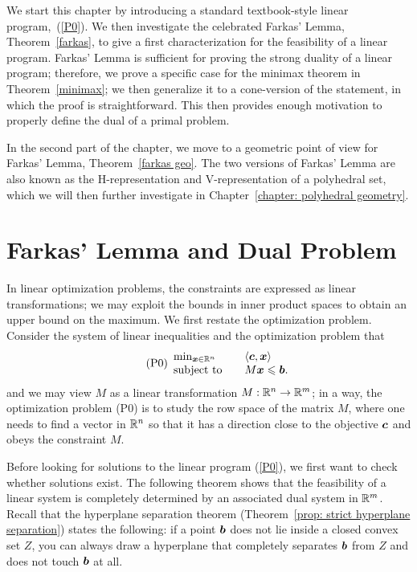 
We start this chapter by introducing a standard textbook-style linear program,~(\ref{P0}). We then investigate the celebrated Farkas' Lemma, Theorem~\ref{farkas}, to give a first characterization for the feasibility of a linear program. Farkas' Lemma is sufficient for proving the strong duality of a linear program; therefore, we prove a specific case for the minimax theorem in Theorem~\ref{minimax}; we then generalize it to a cone-version of the statement, in which the proof is straightforward. This then provides enough motivation to properly define the dual of a primal problem. 

In the second part of the chapter, we move to a geometric point of view for Farkas' Lemma, Theorem~\ref{farkas geo}. The two versions of Farkas' Lemma are also known as the H-representation and V-representation of a polyhedral set, which we will then further investigate in Chapter~\ref{chapter: polyhedral geometry}. 

\section{Farkas' Lemma and Dual Problem}

In linear optimization problems, the constraints are expressed as linear transformations; we may exploit the bounds in inner product spaces to obtain an upper bound on the maximum. We first restate the optimization problem. Consider the system of linear inequalities and the optimization problem that
\begin{equation}\label{P0}\tag{P0}
\begin{array}{ll}
\mathrm{min}_{{\boldsymbol x}\in\mathbb R^n}  \quad & \left\langle{\boldsymbol c}, {\boldsymbol x}\right\rangle\\
\text{subject to} \quad & M{\boldsymbol x}  \leqslant {\boldsymbol b}.
\end{array}
\end{equation}
and we may view $M$ as a linear transformation $M:\mathbb R^n \to \mathbb R^m$; in a way, the optimization problem (P0) is to study the row space of the matrix $M$, where one needs to find a vector in $\mathbb R^n$ so that it has a direction close to the objective ${\boldsymbol c}$ and obeys the constraint $M$.  

Before looking for solutions to the linear program (\ref{P0}), we first want to check whether solutions exist. The following theorem shows that the feasibility of a linear system is completely determined by an associated dual system in $\mathbb R^m$. Recall that the hyperplane separation theorem (Theorem~\ref{prop: strict hyperplane separation}) states the following: if a point ${\boldsymbol b}$ does not lie inside a closed convex set $Z$, you can always draw a hyperplane that completely separates ${\boldsymbol b}$ from $Z$ and does not touch ${\boldsymbol b}$ at all. 


